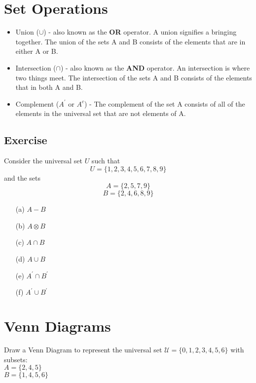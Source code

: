 \documentclass[]{report}
\begin{document}
\newpage
\section*{Set Operations}
\begin{itemize}
	\item Union ($\cup$) - also known as the \textbf{OR} operator. A union signifies a bringing together. The union of the sets A and B consists of the elements that are in either A or B.
	\item Intersection ($\cap$) - also known as the \textbf{AND} operator. An intersection is where two things meet. The intersection of the sets A and B consists of the elements that in both A and B.
	\item Complement ($A^{\prime}$ or $A^{c}$) - The complement of the set A consists of all of the elements in the universal set that are not elements of A.
\end{itemize}

\subsection*{Exercise}
Consider the universal set $U$ such that
\[U=\{1,2,3,4,5,6,7,8,9\} \] 
and the sets
\[A=\{2,5,7,9\} \] 
\[B=\{2,4,6,8,9\} \]

\begin{multicols}{2}
	\begin{itemize}
		\item[(a)] $A-B$
		\item[(b)] $A \otimes B$
		\item[(c)] $A \cap B$
		\item[(d)] $A \cup B$
		\item[(e)] $A^{\prime} \cap B^{\prime}$
		\item[(f)] $A^{\prime} \cup B^{\prime}$
	\end{itemize}
\end{multicols}

\newpage

\section*{Venn Diagrams}

Draw a Venn Diagram to represent the universal set
$\mathcal{U} = \{0,1,2,3,4,5,6\}$ with subsets:\\
$A = \{2,4,5\}$\\
$B = \{1,4,5,6\}$\\
\end{document}

